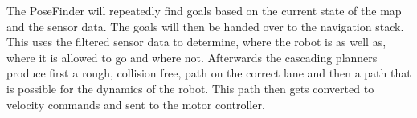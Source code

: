 The PoseFinder will repeatedly find goals based on the current state of the map and the sensor data. The goals will then be handed over to the navigation stack. This uses the filtered sensor data to determine, where the robot is as well as, where it is allowed to go and where not. Afterwards the cascading planners produce first a rough, collision free, path on the correct lane and then a path that is possible for the dynamics of the robot. This path then gets converted to velocity commands and sent to the motor controller.\\




